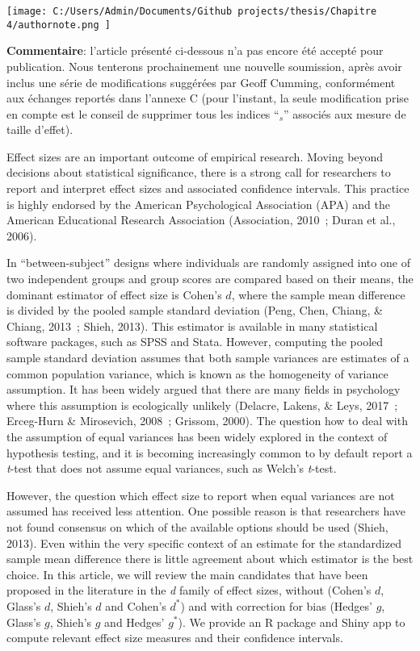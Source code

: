 \documentclass[
  12pt,
  french,
]{article}
\begin{document}
\begin{center}\texttt{[image: C:/Users/Admin/Documents/Github projects/thesis/Chapitre 4/authornote.png
]} \end{center}

\textbf{Commentaire}: l'article présenté ci-dessous n'a pas encore été
accepté pour publication. Nous tenterons prochainement une nouvelle
soumission, après avoir inclus une série de modifications suggérées par
Geoff Cumming, conformément aux échanges reportés dans l'annexe C (pour
l'instant, la seule modification prise en compte est le conseil de
supprimer tous les indices ``\(_s\)'' associés aux mesure de taille
d'effet).

\newpage

Effect sizes are an important outcome of empirical research. Moving
beyond decisions about statistical significance, there is a strong call
for researchers to report and interpret effect sizes and associated
confidence intervals. This practice is highly endorsed by the American
Psychological Association (APA) and the American Educational Research
Association (Association, 2010~; Duran et al., 2006).

In ``between-subject'' designs where individuals are randomly assigned
into one of two independent groups and group scores are compared based
on their means, the dominant estimator of effect size is Cohen's \(d\),
where the sample mean difference is divided by the pooled sample
standard deviation (Peng, Chen, Chiang, \& Chiang, 2013~; Shieh, 2013).
This estimator is available in many statistical software packages, such
as SPSS and Stata. However, computing the pooled sample standard
deviation assumes that both sample variances are estimates of a common
population variance, which is known as the homogeneity of variance
assumption. It has been widely argued that there are many fields in
psychology where this assumption is ecologically unlikely (Delacre,
Lakens, \& Leys, 2017~; Erceg-Hurn \& Mirosevich, 2008~; Grissom, 2000).
The question how to deal with the assumption of equal variances has been
widely explored in the context of hypothesis testing, and it is becoming
increasingly common to by default report a \emph{t}-test that does not
assume equal variances, such as Welch's \emph{t}-test.

However, the question which effect size to report when equal variances
are not assumed has received less attention. One possible reason is that
researchers have not found consensus on which of the available options
should be used (Shieh, 2013). Even within the very specific context of
an estimate for the standardized sample mean difference there is little
agreement about which estimator is the best choice. In this article, we
will review the main candidates that have been proposed in the
literature in the \emph{d} family of effect sizes, without (Cohen's
\(d\), Glass's \(d\), Shieh's \(d\) and Cohen's \(d^*\)) and with
correction for bias (Hedges' \(g\), Glass's \(g\), Shieh's \(g\) and
Hedges' \(g^*\)). We provide an R package and Shiny app to compute
relevant effect size measures and their confidence intervals.
\end{document}
